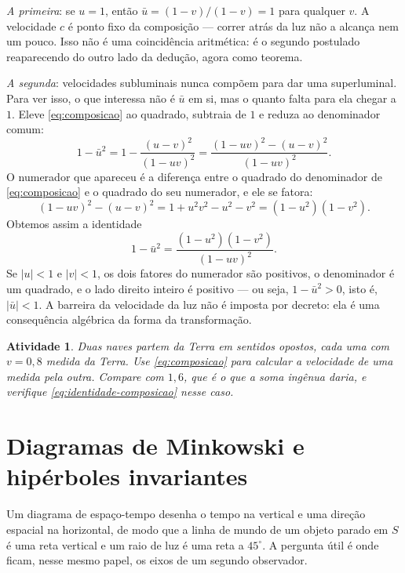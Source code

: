 \documentclass[12pt,a4paper,oneside]{book}
\theoremstyle{rgplain}
\newtheorem{activity}{Atividade}[chapter]
\theoremstyle{rgremark}
\begin{document}
\emph{A primeira}: se $u=1$, então $\bar u=(1-v)/(1-v)=1$ para qualquer $v$. A
velocidade $c$ é ponto fixo da composição --- correr atrás da luz não a
alcança nem um pouco. Isso não é uma coincidência aritmética: é o segundo
postulado reaparecendo do outro lado da dedução, agora como teorema.

\emph{A segunda}: velocidades subluminais nunca compõem para dar uma
superluminal. Para ver isso, o que interessa não é $\bar u$ em si, mas o quanto
falta para ela chegar a $1$. Eleve \eqref{eq:composicao} ao quadrado, subtraia
de $1$ e reduza ao denominador comum:
\[
  1-\bar u^2=1-\frac{(u-v)^2}{(1-uv)^2}=\frac{(1-uv)^2-(u-v)^2}{(1-uv)^2}.
\]
O numerador que apareceu é a diferença entre o quadrado do denominador de
\eqref{eq:composicao} e o quadrado do seu numerador, e ele se fatora:
\[
  (1-uv)^2-(u-v)^2=1+u^2v^2-u^2-v^2=(1-u^2)(1-v^2).
\]
Obtemos assim a identidade
\begin{equation}
  1-\bar u^2=\frac{(1-u^2)(1-v^2)}{(1-uv)^2}.
  \label{eq:identidade-composicao}
\end{equation}
Se $|u|<1$ e $|v|<1$, os dois fatores do numerador são positivos, o denominador é um quadrado, e o lado direito inteiro
é positivo --- ou seja, $1-\bar u^2>0$, isto é, $|\bar u|<1$. A barreira da velocidade
da luz não é imposta por decreto: ela é uma consequência algébrica da forma da
transformação.

\begin{activity}
Duas naves partem da Terra em sentidos opostos, cada uma com $v=0{,}8$ medida
da Terra. Use \eqref{eq:composicao} para calcular a velocidade de uma medida
pela outra. Compare com $1{,}6$, que é o que a soma ingênua daria, e verifique
\eqref{eq:identidade-composicao} nesse caso.
\end{activity}

\section{Diagramas de Minkowski e hipérboles invariantes}
\label{sec:diagramas}

Um diagrama de espaço-tempo desenha o tempo na vertical e uma direção espacial
na horizontal, de modo que a linha de mundo de um objeto parado em $S$ é uma
reta vertical e um raio de luz é uma reta a $45^\circ$. A pergunta útil é onde
ficam, nesse mesmo papel, os eixos de um segundo observador.
\end{document}
